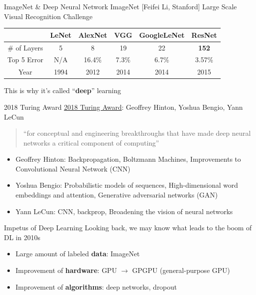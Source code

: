 \documentclass{../TexTemplate/myslide}
\begin{document}
\begin{frame}{ImageNet \& Deep Neural Network}
ImageNet [Feifei Li, Stanford] Large Scale Visual Recognition Challenge
\begin{center}
\begin{tabular}{cccccc}\hline\hline
 & LeNet & AlexNet & VGG & GoogleLeNet & ResNet\\\hline
\# of Layers & 5 & 8 & 19 & 22 & \textbf{152}\\\hline
Top 5 Error & N/A & 16.4\% & 7.3\% & 6.7\% & 3.57\%\\\hline
Year & 1994 & 2012 & 2014 & 2014 & 2015\\\hline
\end{tabular}
\end{center}
This is why it's called ``\textbf{deep}'' learning\\
\end{frame}

\begin{frame}{2018 Turing Award}
\href{https://awards.acm.org/about/2018-turing}{2018 Turing Award}: Geoffrey Hinton, Yoshua Bengio, Yann LeCun
\\\bigskip
\begin{quote}
``for conceptual and engineering breakthroughs that have made deep neural networks a critical component of computing''
\end{quote}
\begin{itemize}
	\item Geoffrey Hinton: Backpropagation, Boltzmann Machines, Improvements to Convolutional Neural Network (CNN)
	\item Yoshua Bengio: Probabilistic models of sequences, High-dimensional word embeddings and attention, Generative adversarial networks (GAN)
	\item Yann LeCun: CNN, backprop, Broadening the vision of neural networks
\end{itemize}
\end{frame}

\begin{frame}{Impetus of Deep Learning}
Looking back, we may know what leads to the boom of DL in 2010s
\begin{itemize}
	\item Large amount of labeled \textbf{data}: ImageNet
	\item Improvement of \textbf{hardware}: GPU $\to$ GPGPU (general-purpose GPU)
	\item Improvement of \textbf{algorithms}: deep networks, dropout
\end{itemize}
\end{frame}
\end{document}
